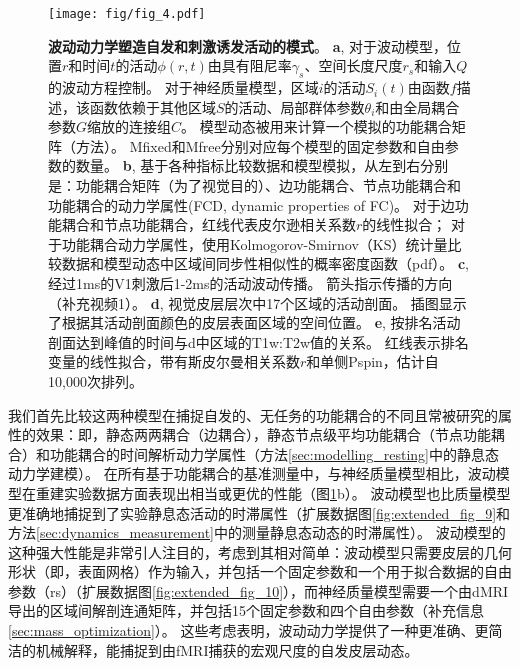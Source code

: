 \documentclass[lang=cn,a4paper,newtx]{elegantpaper}
\begin{document}
\begin{figure}[!htb]
	\centering
	\texttt{[image: fig/fig\_4.pdf]}
	\caption{\textbf{波动动力学塑造自发和刺激诱发活动的模式}。
	\textbf{a}, 对于波动模型，位置$ r $和时间$ t $的活动$ \phi(r,t) $由具有阻尼率$ \gamma_s $、空间长度尺度$ r_s $和输入$ Q $的波动方程控制。
	对于神经质量模型，区域$ i $的活动$ S_i(t) $由函数$ f $描述，该函数依赖于其他区域$ S $的活动、局部群体参数$ \theta_i $和由全局耦合参数$ G $缩放的连接组$ C $。
	模型动态被用来计算一个模拟的功能耦合矩阵（方法）。
	Mfixed和Mfree分别对应每个模型的固定参数和自由参数的数量。
	\textbf{b}, 基于各种指标比较数据和模型模拟，从左到右分别是：功能耦合矩阵（为了视觉目的）、边功能耦合、节点功能耦合和功能耦合的动力学属性(FCD, dynamic properties of FC)。
	对于边功能耦合和节点功能耦合，红线代表皮尔逊相关系数$ r $的线性拟合；
	对于功能耦合动力学属性，使用Kolmogorov-Smirnov（KS）统计量比较数据和模型动态中区域间同步性相似性的概率密度函数（pdf）。
	\textbf{c}, 经过1ms的V1刺激后1-2ms的活动波动传播。
	箭头指示传播的方向（补充视频1）。
	\textbf{d}, 视觉皮层层次中17个区域的活动剖面。
	插图显示了根据其活动剖面颜色的皮层表面区域的空间位置。
	\textbf{e}, 按排名活动剖面达到峰值的时间与d中区域的T1w:T2w值的关系。
	红线表示排名变量的线性拟合，带有斯皮尔曼相关系数$ r $和单侧Pspin，估计自10,000次排列。
	} \label{fig:4}
\end{figure}


我们首先比较这两种模型在捕捉自发的、无任务的功能耦合的不同且常被研究的属性的效果：即，静态两两耦合（边耦合），静态节点级平均功能耦合（节点功能耦合）和功能耦合的时间解析动力学属性（方法\ref{sec:modelling_resting}中的静息态动力学建模）。
在所有基于功能耦合的基准测量中，与神经质量模型相比，波动模型在重建实验数据方面表现出相当或更优的性能（图\ref{fig:4}b）。
波动模型也比质量模型更准确地捕捉到了实验静息态活动的时滞属性（扩展数据图\ref{fig:extended_fig_9}和方法\ref{sec:dynamics_measurement}中的测量静息态动态的时滞属性）。
波动模型的这种强大性能是非常引人注目的，考虑到其相对简单：波动模型只需要皮层的几何形状（即，表面网格）作为输入，并包括一个固定参数和一个用于拟合数据的自由参数（rs）（扩展数据图\ref{fig:extended_fig_10}），而神经质量模型需要一个由dMRI导出的区域间解剖连通矩阵，并包括15个固定参数和四个自由参数（补充信息\ref{sec:mass_optimization}）。
这些考虑表明，波动动力学提供了一种更准确、更简洁的机械解释，能捕捉到由fMRI捕获的宏观尺度的自发皮层动态。
\end{document}
